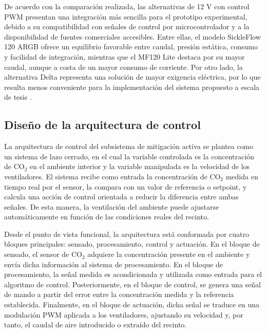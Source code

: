 De acuerdo con la comparación realizada, las alternativas de 12 V con control PWM presentan una integración más sencilla para el prototipo experimental, debido a su compatibilidad con señales de control por microcontrolador y a la disponibilidad de fuentes comerciales accesibles. Entre ellas, el modelo SickleFlow 120 ARGB ofrece un equilibrio favorable entre caudal, presión estática, consumo y facilidad de integración, mientras que el MF120 Lite destaca por su mayor caudal, aunque a costa de un mayor consumo de corriente. Por otro lado, la alternativa Delta representa una solución de mayor exigencia eléctrica, por lo que resulta menos conveniente para la implementación del sistema propuesto a escala de tesis \cite{cm_sickleflow_2026, cm_mf120_halo_2026, cm_mf120_lite_2026, delta_pfb1224uhep0_2026}.



\subsection{Diseño de la arquitectura de control}

La arquitectura de control del subsistema de mitigación activa se plantea como un sistema de lazo cerrado, en el cual la variable controlada es la concentración de CO$_2$ en el ambiente interior y la variable manipulada es la velocidad de los ventiladores. El sistema recibe como entrada la concentración de CO$_2$ medida en tiempo real por el sensor, la compara con un valor de referencia o setpoint, y calcula una acción de control orientada a reducir la diferencia entre ambas señales. De esta manera, la ventilación del ambiente puede ajustarse automáticamente en función de las condiciones reales del recinto.

Desde el punto de vista funcional, la arquitectura está conformada por cuatro bloques principales: sensado, procesamiento, control y actuación. En el bloque de sensado, el sensor de CO$_2$ adquiere la concentración presente en el ambiente y envía dicha información al sistema de procesamiento. En el bloque de procesamiento, la señal medida es acondicionada y utilizada como entrada para el algoritmo de control. Posteriormente, en el bloque de control, se genera una señal de mando a partir del error entre la concentración medida y la referencia establecida. Finalmente, en el bloque de actuación, dicha señal se traduce en una modulación PWM aplicada a los ventiladores, ajustando su velocidad y, por tanto, el caudal de aire introducido o extraído del recinto.

